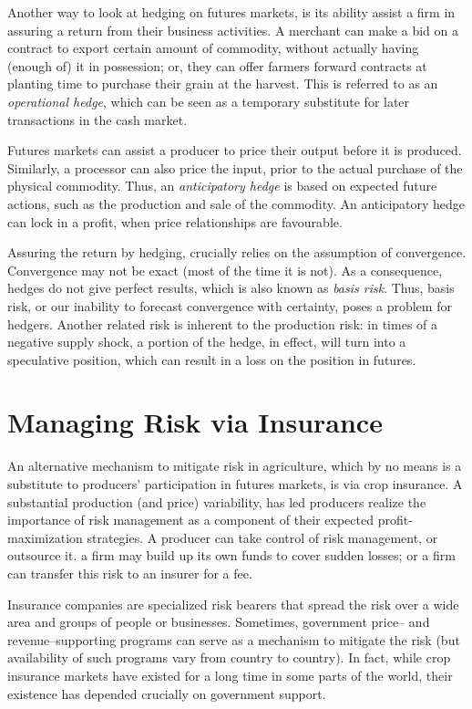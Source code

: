 \documentclass[
]{book}
\begin{document}
Another way to look at hedging on futures markets, is its ability assist a firm in assuring a return from their business activities. A merchant can make a bid on a contract to export certain amount of commodity, without actually having (enough of) it in possession; or, they can offer farmers forward contracts at planting time to purchase their grain at the harvest. This is referred to as an \emph{operational hedge}, which can be seen as a temporary substitute for later transactions in the cash market.

Futures markets can assist a producer to price their output before it is produced. Similarly, a processor can also price the input, prior to the actual purchase of the physical commodity. Thus, an \emph{anticipatory hedge} is based on expected future actions, such as the production and sale of the commodity. An anticipatory hedge can lock in a profit, when price relationships are favourable.

Assuring the return by hedging, crucially relies on the assumption of convergence. Convergence may not be exact (most of the time it is not). As a consequence, hedges do not give perfect results, which is also known as \emph{basis risk}. Thus, basis risk, or our inability to forecast convergence with certainty, poses a problem for hedgers. Another related risk is inherent to the production risk: in times of a negative supply shock, a portion of the hedge, in effect, will turn into a speculative position, which can result in a loss on the position in futures.

\hypertarget{managing-risk-via-insurance}{%
\section{Managing Risk via Insurance}\label{managing-risk-via-insurance}}

An alternative mechanism to mitigate risk in agriculture, which by no means is a substitute to producers' participation in futures markets, is via crop insurance. A substantial production (and price) variability, has led producers realize the importance of risk management as a component of their expected profit-maximization strategies. A producer can take control of risk management, or outsource it. a firm may build up its own funds to cover sudden losses; or a firm can transfer this risk to an insurer for a fee.

Insurance companies are specialized risk bearers that spread the risk over a wide area and groups of people or businesses. Sometimes, government price-- and revenue--supporting programs can serve as a mechanism to mitigate the risk (but availability of such programs vary from country to country). In fact, while crop insurance markets have existed for a long time in some parts of the world, their existence has depended crucially on government support.
\end{document}
